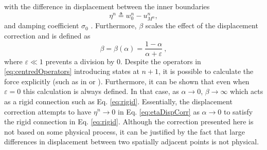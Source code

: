 with the difference in displacement between the inner boundaries
\begin{equation}\label{eq:etaDispCorr}
    \eta^n \triangleq w_0^n - u_{M^n}^n,
\end{equation}
and damping coefficient $\sigma_0$%
. Furthermore, $\beta$ scales the effect of the displacement correction and is defined as
\begin{equation}\label{eq:betaDef}
    \beta = \beta(\alpha) = \frac{1-\alpha}{\alpha + \varepsilon}\ ,
\end{equation}
where $\varepsilon \ll 1$ prevents a division by 0. Despite the operators in \eqref{eq:centredOperators} introducing states at $n+1$, it is possible to calculate the force explicitly (such as in \cite{bilbao2009} or \cite{bilbao2009Dafx}). Furthermore, it can be shown that even when $\varepsilon = 0$ this calculation is always defined. In that case, as $\alpha \rightarrow 0$, $\beta\rightarrow \infty$ 
which acts as a rigid connection such as Eq. \eqref{eq:rigid}. Essentially, the displacement correction attempts to have $\eta^n\rightarrow 0$ in Eq. \eqref{eq:etaDispCorr} as $\alpha \rightarrow 0$ to satisfy the rigid connection in Eq. \eqref{eq:rigid}.
Although the correction presented here is not based on some physical process, it can be justified by the fact that large differences in displacement between two spatially adjacent points is not physical.

